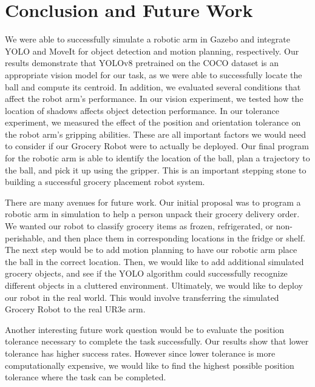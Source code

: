 \documentclass{article}
\begin{document}
\section{Conclusion and Future Work}

We were able to successfully simulate a robotic arm in Gazebo and integrate YOLO and MoveIt for object detection and motion planning, respectively. Our results demonstrate that YOLOv8 pretrained on the COCO dataset is an appropriate vision model for our task, as we were able to successfully locate the ball and compute its centroid. In addition, we evaluated several conditions that affect the robot arm's performance. In our vision experiment, we tested how the location of shadows affects object detection performance. In our tolerance experiment, we measured the effect of the position and orientation tolerance on the robot arm's gripping abilities. These are all important factors we would need to consider if our Grocery Robot were to actually be deployed. Our final program for the robotic arm is able to identify the location of the ball, plan a trajectory to the ball, and pick it up using the gripper. This is an important stepping stone to building a successful grocery placement robot system.

There are many avenues for future work. Our initial proposal was to program a robotic arm in simulation to help a person unpack their grocery delivery order. We wanted our robot to classify grocery items as frozen, refrigerated, or non-perishable, and then place them in corresponding locations in the fridge or shelf. The next step would be to add motion planning to have our robotic arm place the ball in the correct location. Then, we would like to add additional simulated grocery objects, and see if the YOLO algorithm could successfully recognize different objects in a cluttered environment. Ultimately, we would like to deploy our robot in the real world. This would involve transferring the simulated Grocery Robot to the real UR3e arm.  

Another interesting future work question would be to evaluate the position tolerance necessary to complete the task successfully. Our results show that lower tolerance has higher success rates.  However since lower tolerance is more computationally expensive, we would like to find the highest possible position tolerance where the task can be completed. 




\newpage

\end{document}
